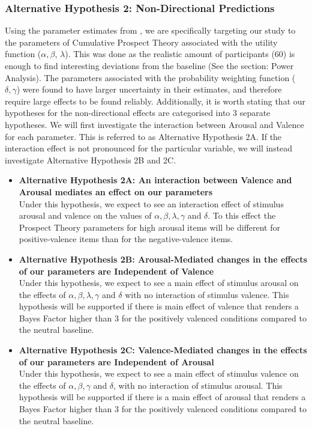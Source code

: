 \documentclass{article}
\begin{document}
    \subsubsection{Alternative Hypothesis 2: Non-Directional Predictions}
    Using the parameter estimates from , we are specifically targeting our study to the parameters of Cumulative Prospect Theory associated with the utility function ($\alpha, \beta$, $\lambda$). This was done as the realistic amount of participants (60) is enough to find interesting deviations from the baseline (See the section: Power Analysis). The parameters associated with the probability weighting function ($\delta, \gamma$) were found to have larger uncertainty in their estimates, and therefore require large effects to be found reliably.
Additionally, it is worth stating that our hypotheses for the non-directional effects are categorised into 3 separate hypotheses. We will first investigate the interaction between Arousal and Valence for each parameter. This is referred to as Alternative Hypothesis 2A. If the interaction effect is not pronounced for the particular variable, we will instead investigate Alternative Hypothesis 2B and 2C. 

\begin{itemize}
    \item \textbf{Alternative Hypothesis 2A: An interaction between Valence and Arousal mediates an effect on our parameters}\\
    Under this hypothesis, we expect to see an interaction effect of stimulus arousal and valence on the values of $\alpha, \beta, \lambda, \gamma$ and $\delta$.  To this effect the Prospect Theory parameters for high arousal items will be different for positive-valence items than for the negative-valence items.
    \item \textbf{Alternative Hypothesis 2B: Arousal-Mediated changes in the effects of our parameters are Independent of Valence}\\
    Under this hypothesis, we expect to see a main effect of stimulus arousal on the effects of $\alpha, \beta, \lambda, \gamma$ and $\delta$ with no interaction of stimulus valence. This hypothesis will be supported if there is main effect of valence that renders a Bayes Factor higher than 3 for the positively valenced conditions compared to the neutral baseline.
    \item \textbf{Alternative Hypothesis 2C: Valence-Mediated changes in the effects of our parameters are Independent of Arousal}\\
    Under this hypothesis, we expect to see a main effect of stimulus valence on the effects of $\alpha, \beta, \gamma$ and $\delta$, with no interaction of stimulus arousal. This hypothesis will be supported if there is a main effect of arousal that renders a Bayes Factor higher than 3 for the positively valenced conditions compared to the neutral baseline.

\end{itemize}
\end{document}
